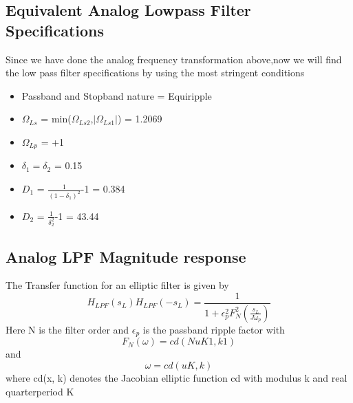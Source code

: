 \documentclass[12pt]{article}
\begin{document}
\subsection{\textbf{Equivalent Analog Lowpass Filter Specifications}}
Since we have done the analog frequency transformation above,now we will find the low pass filter specifications by using the most stringent conditions \\
\begin{itemize}
    \item Passband and Stopband nature = Equiripple
    \item $\Omega_{Ls}$ = min($\Omega_{Ls2}$,$\left|\Omega_{Ls1}\right|$) = 1.2069
    \item $\Omega_{Lp}$ = +1
    \item $\delta_1 = \delta_2$ = 0.15
    \item $D_1$ = $\frac{1}{(1-\delta_1)^2}$-1 = 0.384
    \item $D_2$ = $\frac{1}{\delta_2^2}$-1 = 43.44
\end{itemize}
\subsection{\textbf{Analog LPF Magnitude response}}
The  Transfer function for an elliptic filter is given by
\begin{equation*}
    H_{LPF}(s_L)H_{LPF}(-s_L) = \frac{1}{1+\epsilon_p ^2 F_N ^2(\frac{s_L}{J\omega_p})}
\end{equation*}
Here N is the filter order and $\epsilon_p$ is the passband ripple factor with
\begin{equation*}
        F_N(\omega) = cd(NuK1, k1)
\end{equation*}
and
\begin{equation*}
        \omega = cd(uK, k)
\end{equation*}
where cd(x, k) denotes the Jacobian elliptic function cd with modulus k and real
quarter­period K
\end{document}
